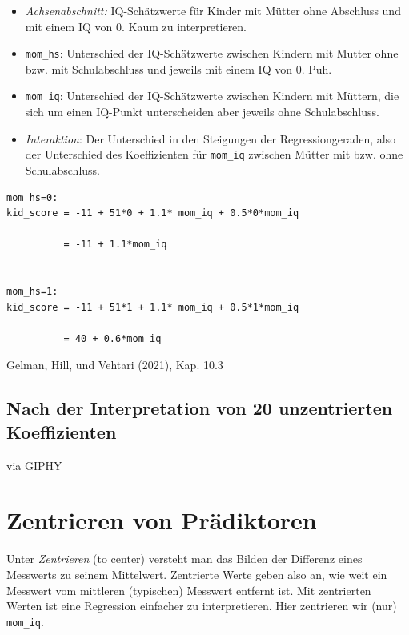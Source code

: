 \documentclass[
  a4paper,
  DIV=11]{scrreprt}
\providecommand{\tightlist}{%
  \setlength{\itemsep}{0pt}\setlength{\parskip}{0pt}}\usepackage{longtable,booktabs,array}
\theoremstyle{definition}
\theoremstyle{remark}
\begin{document}
\begin{itemize}
\tightlist
\item
  \emph{Achsenabschnitt:} IQ-Schätzwerte für Kinder mit Mütter ohne
  Abschluss und mit einem IQ von 0. Kaum zu interpretieren.
\item
  \texttt{mom\_hs}: Unterschied der IQ-Schätzwerte zwischen Kindern mit
  Mutter ohne bzw. mit Schulabschluss und jeweils mit einem IQ von 0.
  Puh.
\item
  \texttt{mom\_iq}: Unterschied der IQ-Schätzwerte zwischen Kindern mit
  Müttern, die sich um einen IQ-Punkt unterscheiden aber jeweils ohne
  Schulabschluss.
\item
  \emph{Interaktion}: Der Unterschied in den Steigungen der
  Regressiongeraden, also der Unterschied des Koeffizienten für
  \texttt{mom\_iq} zwischen Mütter mit bzw. ohne Schulabschluss.
\end{itemize}

\begin{verbatim}
mom_hs=0:
kid_score = -11 + 51*0 + 1.1* mom_iq + 0.5*0*mom_iq

          = -11 + 1.1*mom_iq


mom_hs=1: 
kid_score = -11 + 51*1 + 1.1* mom_iq + 0.5*1*mom_iq

          = 40 + 0.6*mom_iq
\end{verbatim}

Gelman, Hill, und Vehtari (2021), Kap. 10.3

\hypertarget{nach-der-interpretation-von-20-unzentrierten-koeffizienten}{%
\subsection{Nach der Interpretation von 20 unzentrierten
Koeffizienten}\label{nach-der-interpretation-von-20-unzentrierten-koeffizienten}}

via GIPHY

\hypertarget{zentrieren-von-pruxe4diktoren}{%
\section{Zentrieren von
Prädiktoren}\label{zentrieren-von-pruxe4diktoren}}

Unter \emph{Zentrieren} (to center) versteht man das Bilden der
Differenz eines Messwerts zu seinem Mittelwert. Zentrierte Werte geben
also an, wie weit ein Messwert vom mittleren (typischen) Messwert
entfernt ist. Mit zentrierten Werten ist eine Regression einfacher zu
interpretieren. Hier zentrieren wir (nur) \texttt{mom\_iq}.
\end{document}
